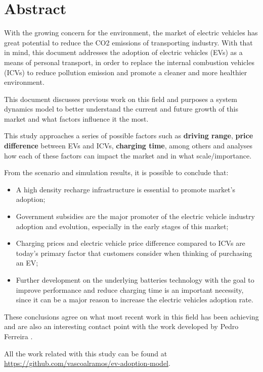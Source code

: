 \section{Abstract} \label{section:abstract}
With the growing concern for the environment, the market of electric vehicles has great potential to reduce the CO2 emissions of transporting industry. With that in mind, this document addresses the adoption of electric vehicles (EVs) as a means of personal transport, in order to replace the internal combustion vehicles (ICVs) to reduce pollution emission and promote a cleaner and more healthier environment.

This document discusses previous work on this field and purposes a system dynamics model to better understand the current and future growth of this market and what factors influence it the most.

This study approaches a series of possible factors such as \textbf{driving range}, \textbf{price difference} between EVs and ICVs, \textbf{charging time}, among others and analyses how each of these factors can impact the market and in what scale/importance.

From the scenario and simulation results, it is possible to conclude that:
\begin{itemize}
\item A high density recharge infrastructure is essential to promote market's adoption;
\item Government subsidies are the major promoter of the electric vehicle industry adoption and evolution, especially in the early stages of this market;
\item Charging prices and electric vehicle price difference compared to ICVs are today's primary factor that customers consider when thinking of purchasing an EV;
\item Further development on the underlying batteries technology with the goal to improve performance and reduce charging time is an important necessity, since it can be a major reason to increase the electric vehicles adoption rate.
\end{itemize}

These conclusions agree on what most recent work in this field has been achieving and are also an interesting contact point with the work developed by Pedro Ferreira \cite{pedro-report}.

All the work related with this study can be found at \url{https://github.com/vascoalramos/ev-adoption-model}.

\clearpage